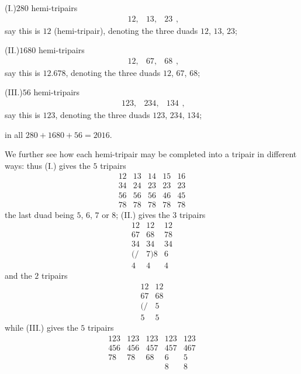 \documentclass[11pt,a4paper]{book}
\begin{document}
\noindent (I.)\quad $280$ hemi-tripairs
\[
\begin{matrix} 12, & 13, & 23 \end{matrix},
\]
say this is $12$ (hemi-tripair), denoting the three duads $12$, $13$, $23$;

\noindent (II.)\quad $1680$ hemi-tripairs
\[
\begin{matrix} 12, & 67, & 68 \end{matrix},
\]
say this is $12.678$, denoting the three duads $12$, $67$, $68$;

\noindent (III.)\quad $56$ hemi-tripairs
\[
\begin{matrix} 123, & 234, & 134 \end{matrix},
\]
say this is $123$, denoting the three duads $123$, $234$, $134$;

\noindent in all $280 + 1680 + 56 = 2016$.

We further see how each hemi-tripair may be completed into a tripair in different ways: thus (I.) gives the $5$ tripairs
\[
\begin{array}{c|c|c|c|c}
12 & 13 & 14 & 15 & 16 \\
\hline
34 & 24 & 23 & 23 & 23 \\
56 & 56 & 56 & 46 & 45 \\
78 & 78 & 78 & 78 & 78
\end{array}
\]
the last duad being $5$, $6$, $7$ or $8$; (II.) gives the $3$ tripairs
\[
\begin{array}{c|c|c}
12 & 12 & 12 \\
\hline
67 & 68 & 78 \\
34 & 34 & 34 \\
(/ & 7)8 & 6\\
4 & 4 & 4
\end{array}
\]
and the $2$ tripairs
\[
\begin{array}{c|c}
12 & 12 \\
\hline
67 & 68 \\
(/ & 5\\
5 & 5
\end{array}
\]
while (III.) gives the $5$ tripairs
\[
\begin{array}{c|c|c|c|c}
123 & 123 & 123 & 123 & 123 \\
\hline
456 & 456 & 457 & 457 & 467 \\
78 & 78 & 68 & 6 & 5\\
 & & & 8 & 8
\end{array}
\]

\vspace{1em}
\end{document}
